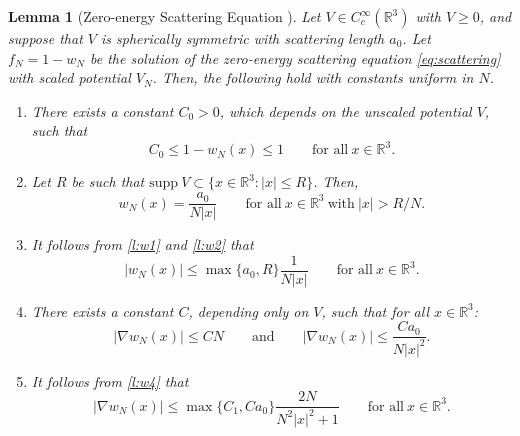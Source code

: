 \documentclass[11pt,a4paper,draft,DIV11]{scrartcl}	%
\newtheorem{lem}[thm]{Lemma}
\newcommand{\R}{\mathds{R}}
\begin{document}
\begin{lem}[Zero-energy Scattering Equation \cite{ESY2010}] \label{l:w}
  Let $V \in C_c^\infty(\R^3)$ with $V \ge 0$, and suppose that $V$ is
  spherically symmetric with scattering length $a_0$. Let $f_N = 1 - w_N$ be
  the solution of the zero-energy scattering equation \eqref{eq:scattering}
  with scaled potential $V_N$. Then, the following hold with constants
  uniform in $N$.
  \begin{enumerate}
    \item \label{l:w1} There exists a constant $C_0 > 0$, which depends on
    the unscaled potential $V$, such that
      \[
        C_0 \le 1 - w_N(x) \le 1 \qquad \text{for all} \ x \in \R^3.
      \]
    \item \label{l:w2} Let $R$ be such that $\text{supp} \ V \subset \{ x
    \in \R^3 : |x| \le R \}$. Then,
      \[
        w_N(x) = \frac{a_0}{N|x|} \qquad \text{for all} \ x \in \R^3 \
        \text{with} \ |x| > R/N.
      \]
    \item \label{l:w3} It follows from \ref{l:w1} and \ref{l:w2} that
      \[
        |w_N(x)| \le \max\{a_0, R\} \frac{1}{N|x|} \qquad \text{for all} \ x
        \in \R^3.
      \]
    \item \label{l:w4} There exists a constant $C$, depending only on
      $V$, such that for all $x \in \R^3$:
      \[
        \lvert\nabla w_N(x)\rvert \le C N \qquad \mbox{and} \qquad |\nabla w_N(x)| \le \frac{C a_0}{N |x|^2}.%
      \]
    \item \label{l:w5} It follows from \ref{l:w4} that
      \[
        |\nabla w_N(x)| \le \max\{ C_1, C a_0 \} \frac{2N}{N^2|x|^2 + 1}
        \qquad \text{for all} \ x \in \R^3.
      \]
  \end{enumerate}
\end{lem}
\end{document}
